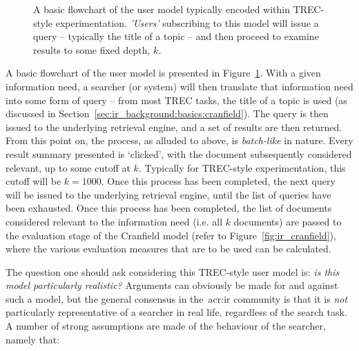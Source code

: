 \begin{figure}[t!]
    \centering
    \caption[The TREC-style user model]{A basic flowchart of the user model typically encoded within TREC-style experimentation. \emph{'Users'} subscribing to this model will issue a query – typically the title of a topic – and then proceed to examine results to some fixed depth, $k$.}
    \label{fig:trec_model}
\end{figure}

A basic flowchart of the user model is presented in Figure~\ref{fig:trec_model}. With a given information need, a searcher (or system) will then translate that information need into some form of query -- from most TREC tasks, the title of a topic is used (as discussed in Section~\ref{sec:ir_background:basics:cranfield}). The query is then issued to the underlying retrieval engine, and a set of results are then returned. From this point on, the process, as alluded to above, is \emph{batch-like} in nature. Every result summary presented is `clicked', with the document subsequently considered relevant, up to some cutoff at $k$. Typically for TREC-style experimentation, this cutoff will be $k=1000$. Once this process has been completed, the next query will be issued to the underlying retrieval engine, until the list of queries have been exhausted. Once this process has been completed, the list of documents considered relevant to the information need (i.e. all $k$ documents) are passed to the evaluation stage of the Cranfield model (refer to Figure~\ref{fig:ir_cranfield}), where the various evaluation measures that are to be used can be calculated.

The question one should ask considering this TREC-style user model is: \emph{is this model particularly realistic?} Arguments can obviously be made for and against such a model, but the general consensus in the~\gls{acr:ir} community is that it is \emph{not} particularly representative of a searcher in real life, regardless of the search task. A number of strong assumptions are made of the behaviour of the searcher, namely that:

